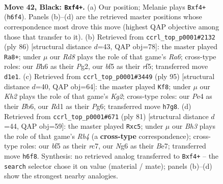 \documentclass[11pt]{article}
\begin{document}
\clearpage

\begin{figure}[p]\centering
\begin{subfigure}{0.46\textwidth}\centering
\resizebox{\linewidth}{!}{%
\newchessgame
\chessboard[
  setfen={8/p6k/Pp4nb/5B2/4pP2/6K1/8/1RBr4 b - - 0 42},
  showmover=false,
  pgfstyle=straightmove, color=movearrow, markmove={h6-f4}
]}
\caption{}
\end{subfigure}\hfill
\begin{subfigure}{0.46\textwidth}\centering
\resizebox{\linewidth}{!}{%
\newchessgame
\chessboard[
  setfen={3k4/2p5/R2p4/3P1r2/6bp/5N2/1PP2KP1/8 w - - 1 44},
  showmover=false,
  pgfstyle=straightmove, color=movearrow, markmove={a6-a8}
]}
\caption{}
\end{subfigure}
\\[4pt]
\begin{subfigure}{0.46\textwidth}\centering
\resizebox{\linewidth}{!}{%
\newchessgame
\chessboard[
  setfen={8/6k1/1b4pp/3pPP2/1p4P1/rB1R4/6K1/8 b - - 0 48},
  showmover=false,
  pgfstyle=straightmove, color=movearrow, markmove={g7-f8}
]}
\caption{}
\end{subfigure}\hfill
\begin{subfigure}{0.46\textwidth}\centering
\resizebox{\linewidth}{!}{%
\newchessgame
\chessboard[
  setfen={8/2R1bk2/2p3p1/1rP4p/4B3/4P1P1/7P/4K3 b - - 0 41},
  showmover=false,
  pgfstyle=straightmove, color=movearrow, markmove={b5-c5}
]}
\caption{}
\end{subfigure}
\caption{\textbf{Move 42, Black: \texttt{Bxf4+}.} (a) Our position; Melanie plays \texttt{Bxf4+} (\texttt{h6f4}). Panels (b)--(d) are the retrieved master positions whose correspondence most drove this move (highest QAP objective among those that transfer to it). (b) Retrieved from \texttt{ccrl\_top\_p0001\#2132} (ply 86) [structural distance $d$=43, QAP obj=78]: the master played \texttt{Ra8+}; under $\mu$ our \emph{Rd8} plays the role of that game's \emph{Ra6}; cross-type roles: our \emph{B}h6 as their \emph{P}g2, our \emph{b}f5 as their \emph{r}f5; transferred move \texttt{d1e1}. (c) Retrieved from \texttt{ccrl\_top\_p0001\#3449} (ply 95) [structural distance $d$=40, QAP obj=64]: the master played \texttt{Kf8}; under $\mu$ our \emph{Kh2} plays the role of that game's \emph{Kg2}; cross-type roles: our \emph{P}e4 as their \emph{B}b6, our \emph{R}d1 as their \emph{P}g6; transferred move \texttt{h7g8}. (d) Retrieved from \texttt{ccrl\_top\_p0001\#671} (ply 81) [structural distance $d$=44, QAP obj=59]: the master played \texttt{Rxc5}; under $\mu$ our \emph{Bh3} plays the role of that game's \emph{Rb4} (a \textbf{cross-type} correspondence); cross-type roles: our \emph{b}f5 as their \emph{r}c7, our \emph{N}g6 as their \emph{B}e7; transferred move \texttt{h6f8}. Synthesis: no retrieved analog transferred to \texttt{Bxf4+} -- the \texttt{search} selector chose it on value (material / mate); panels (b)--(d) show the strongest nearby analogies.}
\label{fig:thought-m83}
\end{figure}
\end{document}
